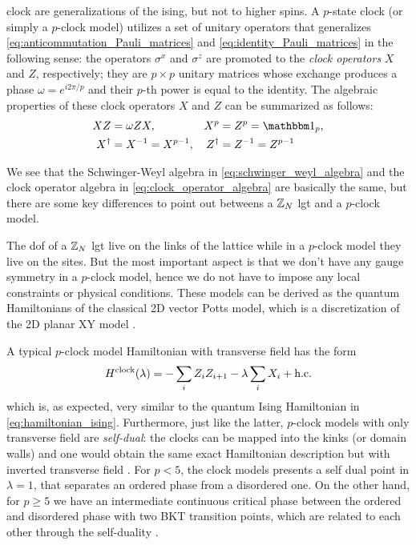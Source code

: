 \Ac{clock} are generalizations of the \ac{ising}, but not to higher spins.
A $p$-state \ac{clock} (or simply a $p$-clock model) utilizes a set of unitary operators that generalizes \eqref{eq:anticommutation_Pauli_matrices} and \eqref{eq:identity_Pauli_matrices} in the following sense:
the operators $\sigma^x$ and $\sigma^z$ are promoted to the \emph{clock operators} $X$ and $Z$, respectively;
they are $p \times p$ unitary matrices whose exchange produces a phase $\omega = e^{i 2 \pi / p}$ and their $p$-th power is equal to the identity.
The algebraic properties of these clock operators $X$ and $Z$ can be summarized as follows:
\begin{equation}
    \begin{aligned}
        X Z & = \omega Z X, &
        X^p & =  Z^p = \identity_p, \\
        X^\dagger & = X^{-1} = X^{p-1}, &
        Z^\dagger & = Z^{-1} = Z^{p-1}
    \end{aligned}
    \label{eq:clock_operator_algebra}
\end{equation}

We see that the Schwinger-Weyl algebra in \eqref{eq:schwinger_weyl_algebra} and the clock operator algebra in \eqref{eq:clock_operator_algebra} are basically the same, but there are some key differences to point out betweens a $\mathbb{Z}_N$ \ac{lgt} and a $p$-clock model.

The \ac{dof} of a $\mathbb{Z}_N$ \ac{lgt} live on the links of the lattice while in a $p$-clock model they live on the sites.
But the most important aspect is that we don't have any gauge symmetry in a $p$-clock model, hence we do not have to impose any local constraints or physical conditions.
These models can be derived as the quantum Hamiltonians of the classical 2D vector Potts model, which is a discretization of the 2D planar XY model \cite{ortiz2012dualities}.

A typical $p$-clock model Hamiltonian with transverse field has the form
\begin{equation}
    H^{\text{clock}}(\lambda) = - \sum_{i} Z_i Z_{i+1} - \lambda \sum_{i} X_i + \text{h.c.}
    \label{eq:clock_hamiltonian}
\end{equation}
which is, as expected, very similar to the quantum Ising Hamiltonian in \eqref{eq:hamiltonian_ising}.
Furthermore, just like the latter, $p$-clock models with only transverse field are \emph{self-dual}:
the clocks can be mapped into the kinks (or domain walls) and one would obtain the same exact Hamiltonian description but with inverted transverse field \cite{ortiz2012dualities}.
For $p < 5$, the clock models presents a self dual point in $\lambda = 1$, that separates an ordered phase from a disordered one.
On the other hand, for $p \geq 5$ we have an intermediate continuous critical phase between the ordered and disordered phase with two BKT transition points, which are related to each other through the self-duality \cite{sun2019phase}.

